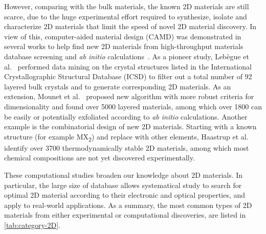 %
However, comparing with the bulk materials, the known 2D materials are
still scarce, due to the
huge experimental effort required to synthesize, isolate and
characterize 2D materials that limit the speed of novel 2D material
discovery.
% 
In view of this, computer-aided material design (CAMD) was
demonstrated in several works to help find new 2D materials from
high-throughput materials database screening and \textit{ab initio}
calculations~\cite{Lebegue_2013_prx,Zhuang_2013_database,Haastrup_2018_database,Mounet_2018_database,Zhou_2019_database}.
%
As a pioneer study, Lebègue et al.~\cite{Lebegue_2013_prx} performed
data mining on the crystal structures listed in the International
Crystallographic Structural Database (ICSD) to filter out a total
number of 92 layered bulk crystals and to generate corresponding 2D
materials. As an extension, Mounet et al.~\cite{Mounet_2018_database}
proposed new algorithm with more robust criteria for dimensionality
and found over 5000 layered materials, among which over 1800 can be
easily or potentially exfoliated according to \textit{ab initio}
calculations.
%
Another example is the combinatorial design of new 2D materials.
Starting with a known structure (for example MX\textsubscript{2}) and
replace with other elements, Haastrup et
al.~\cite{Haastrup_2018_database} identify over 3700
thermo\-dynamically stable 2D materials, among which most chemical
compositions are not yet discovered experimentally.

These computational studies broaden our knowledge about 2D
materials. In particular, the large size of database allows
systematical study to search for optimal 2D material according to
their electronic and optical properties, and apply to real-world
applications. As a summary, the most common types of 2D materials from
either experimental or computational discoveries, are listed in
\autoref{tab:category-2D}.

